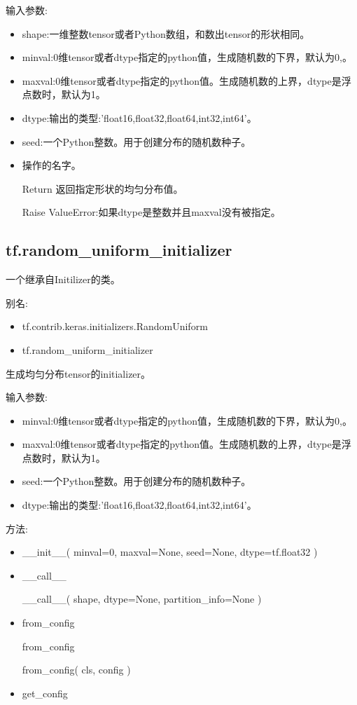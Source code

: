 输入参数:
\begin{itemize}
\item shape:一维整数tensor或者Python数组，和数出tensor的形状相同。
\item minval:0维tensor或者dtype指定的python值，生成随机数的下界，默认为0,。
\item maxval:0维tensor或者dtype指定的python值。生成随机数的上界，dtype是浮点数时，默认为1。
\item dtype:输出的类型:'float16,float32,float64,int32,int64'。
\item seed:一个Python整数。用于创建分布的随机数种子。
\item 操作的名字。
\item [Return] 返回指定形状的均匀分布值。
\item [Raise] ValueError:如果dtype是整数并且maxval没有被指定。
\end{itemize}
\subsection{\textbf{tf.random\_uniform\_initializer}}
一个继承自Initilizer的类。

别名:
\begin{itemize}
\item tf.contrib.keras.initializers.RandomUniform
\item tf.random\_uniform\_initializer
\end{itemize}
生成均匀分布tensor的initializer。

输入参数:
\begin{itemize}
\item minval:0维tensor或者dtype指定的python值，生成随机数的下界，默认为0,。
\item maxval:0维tensor或者dtype指定的python值。生成随机数的上界，dtype是浮点数时，默认为1。
\item seed:一个Python整数。用于创建分布的随机数种子。
\item dtype:输出的类型:'float16,float32,float64,int32,int64'。
\end{itemize}
方法:
\begin{itemize}
\item \begin{python}__init__(
    minval=0,
    maxval=None,
    seed=None,
    dtype=tf.float32
)\end{python}
\item \_\_call\_\_
\begin{python}
__call__(
    shape,
    dtype=None,
    partition_info=None
)
\end{python}
\item from\_config
\begin{python}
from_config

from_config(
    cls,
    config
)
\end{python}
\item get\_config
\end{itemize}
